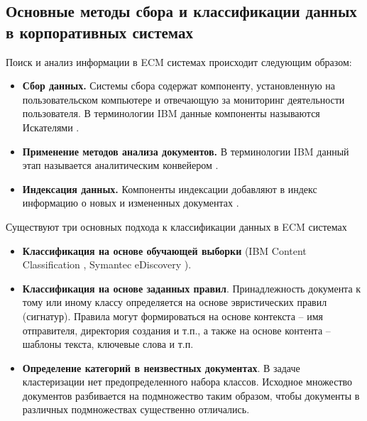 \documentclass[russian, utf8, emptystyle]{eskdtext}
\begin{document}
\subsection{Основные методы сбора и классификации данных в корпоративных системах}
Поиск и анализ информации в ECM системах происходит следующим образом:
\begin{itemize}
	\item {\bf Сбор данных.} Системы сбора содержат компоненту, установленную на пользовательском компьютере и отвечающую за мониторинг деятельности пользователя. В терминологии IBM данные компоненты называются Искателями \cite{searcher}.
	\item {\bf Применение методов анализа документов.} В терминологии IBM данный этап называется аналитическим конвейером \cite{analitic}.
	\item {\bf Индексация данных.} Компоненты индексации добавляют в индекс информацию о новых и измененных документах
	\cite{idx1,idx2,idx3}.
\end{itemize}

Существуют три основных подхода к классификации данных в ECM системах
\begin{itemize}
	\item {\bf Классификация на основе обучающей выборки} (IBM Content Classification \cite{ContentClassification}, Symantec eDiscovery \cite{Symantec}).
	\item {\bf Классификация на основе заданных правил}. Принадлежность документа к тому или иному классу определяется на основе эвристических правил (сигнатур). Правила могут формироваться на основе контекста – имя отправителя, директория создания и т.п., а также на основе контента – шаблоны текста, ключевые слова и т.п. 
	\item {\bf Определение категорий в неизвестных документах}.
	В задаче кластеризации нет предопределенного набора классов. Исходное множество документов разбивается на подмножество таким образом, чтобы документы в различных подмножествах существенно отличались.
\end{itemize}
\end{document}

